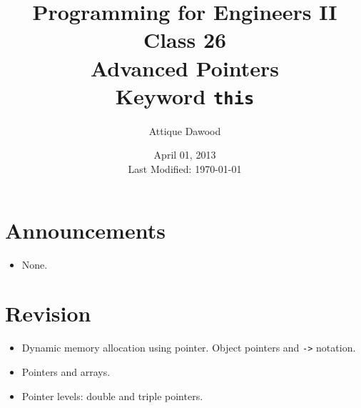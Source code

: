 \documentclass[12pt,a4paper]{article}
\title{\vspace{-2cm}Programming for Engineers II\\Class 26\\Advanced Pointers\\Keyword \texttt{this}}
\author{Attique Dawood}
\date{April 01, 2013\\[0.2cm] Last Modified: \today}
\begin{document}
\maketitle
\section{Announcements}
\begin{itemize}
\item None.
\end{itemize}
\section{Revision}
\begin{itemize}
\item Dynamic memory allocation using pointer. Object pointers and \verb|->| notation.
\item Pointers and arrays.
\item Pointer levels: double and triple pointers.
\end{itemize}
\end{document}
